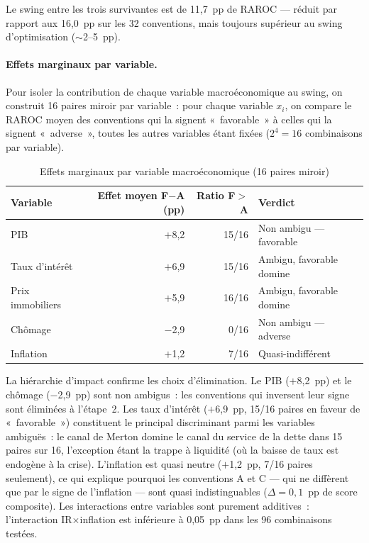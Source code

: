 \documentclass[10pt, a4paper, oneside]{report}
\theoremstyle{definition}
\begin{document}
Le swing entre les trois survivantes est de 11{,}7~pp de RAROC --- réduit par rapport aux 16{,}0~pp sur les 32 conventions, mais toujours supérieur au swing d'optimisation ($\sim$2--5~pp).

\paragraph{Effets marginaux par variable.} Pour isoler la contribution de chaque variable macroéconomique au swing, on construit 16 paires miroir par variable~: pour chaque variable $x_i$, on compare le RAROC moyen des conventions qui la signent «~favorable~» à celles qui la signent «~adverse~», toutes les autres variables étant fixées ($2^4 = 16$ combinaisons par variable).

\begin{table}[htbp]
\centering
\caption{Effets marginaux par variable macroéconomique (16 paires miroir)}
\label{tab:effets-marginaux}
\small
\begin{tabular}{lrrl}
\toprule
Variable & Effet moyen F$-$A (pp) & Ratio F$>$A & Verdict \\
\midrule
PIB & $+$8{,}2 & 15/16 & Non ambigu --- favorable \\
Taux d'intérêt & $+$6{,}9 & 15/16 & Ambigu, favorable domine \\
Prix immobiliers & $+$5{,}9 & 16/16 & Ambigu, favorable domine \\
Chômage & $-$2{,}9 & 0/16 & Non ambigu --- adverse \\
Inflation & $+$1{,}2 & 7/16 & Quasi-indifférent \\
\bottomrule
\end{tabular}
\end{table}

La hiérarchie d'impact confirme les choix d'élimination. Le PIB ($+$8{,}2~pp) et le chômage ($-$2{,}9~pp) sont non ambigus~: les conventions qui inversent leur signe sont éliminées à l'étape~2. Les taux d'intérêt ($+$6{,}9~pp, 15/16 paires en faveur de «~favorable~») constituent le principal discriminant parmi les variables ambiguës~: le canal de Merton \citep{altavilla_boucinha_peydro2018} domine le canal du service de la dette dans 15 paires sur 16, l'exception étant la trappe à liquidité (où la baisse de taux est endogène à la crise). L'inflation est quasi neutre ($+$1{,}2~pp, 7/16 paires seulement), ce qui explique pourquoi les conventions A et C --- qui ne diffèrent que par le signe de l'inflation --- sont quasi indistinguables ($\Delta = 0{,}1$~pp de score composite). Les interactions entre variables sont purement additives~: l'interaction IR$\times$inflation est inférieure à 0{,}05~pp dans les 96 combinaisons testées.
\end{document}
